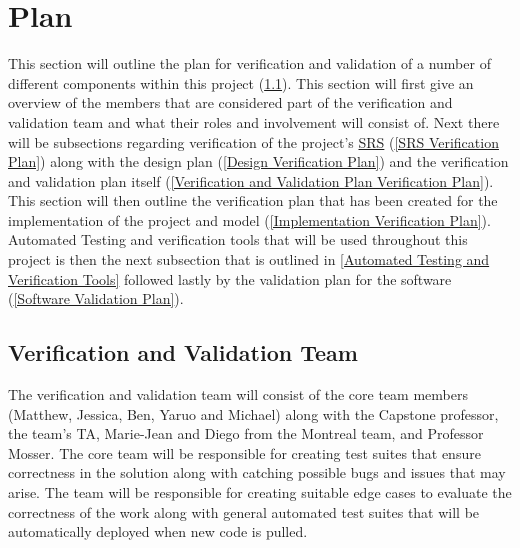 \documentclass[12pt, titlepage]{article}
\begin{document}
\section{Plan}

This section will outline the plan for verification and validation of a number of different components within this project  (\ref{Verification and Validation Team}). This section will first give an overview of the members that are considered part of the verification and validation team and what their roles and involvement will consist of. Next there will be subsections regarding verification of the project's \href{https://github.com/MichaelBreau/nlp-mentalhealth/blob/main/docs/SRS/index.pdf}{SRS} (\ref{SRS Verification Plan}) along with the design plan (\ref{Design Verification Plan}) and the verification and validation plan itself (\ref{Verification and Validation Plan Verification Plan}). This section will then outline the verification plan that has been created for the implementation of the project and model (\ref{Implementation Verification Plan}). Automated Testing and verification tools that will be used throughout this project is then the next subsection that is outlined in \ref{Automated Testing and Verification Tools} followed lastly by the validation plan for the software (\ref{Software Validation Plan}).
  
  \subsection{Verification and Validation Team} \label{Verification and Validation Team}

  
  The verification and validation team will consist of the core team members (Matthew, Jessica, Ben, Yaruo and Michael) along with the Capstone professor, the team's TA, Marie-Jean and Diego from the Montreal team, and Professor Mosser.  The core team will be responsible for creating test suites that ensure correctness in the solution along with catching possible bugs and issues that may arise. The team will be responsible for creating suitable edge cases to evaluate the correctness of the work along with general automated test suites that will be automatically deployed when new code is pulled.\\
  
\end{document}
